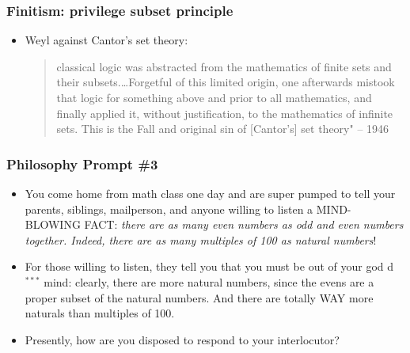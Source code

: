\begin{frame}
\frametitle{Finitism: privilege subset principle}

\begin{itemize}[<+->]

\item Weyl against Cantor's set theory:

\begin{quote}
classical logic was abstracted from the mathematics of finite sets and their subsets.\dots Forgetful of this limited origin, one afterwards mistook that logic for something above and prior to all mathematics, and finally applied it, without justification, to the mathematics of infinite sets. This is the Fall and original sin of [Cantor's] set theory" -- 1946
\end{quote}

\end{itemize}
\end{frame}



\begin{frame}
\frametitle{Philosophy Prompt \#3}

\begin{itemize}[<+->]

\item You come home from math class one day and are super pumped to tell your parents, siblings, mailperson, and anyone willing to listen a MIND-BLOWING FACT: \textit{there are as many even numbers as odd and even numbers together. Indeed, there are as many multiples of 100 as natural numbers}!

\item For those willing to listen, they tell you that you must be out of your god d$^{***}$ mind: clearly, there are more natural numbers, since the evens are a proper subset of the natural numbers. And there are totally WAY more naturals than multiples of 100. 


\item Presently, how are you disposed to respond to your interlocutor?


\end{itemize}
\end{frame}

